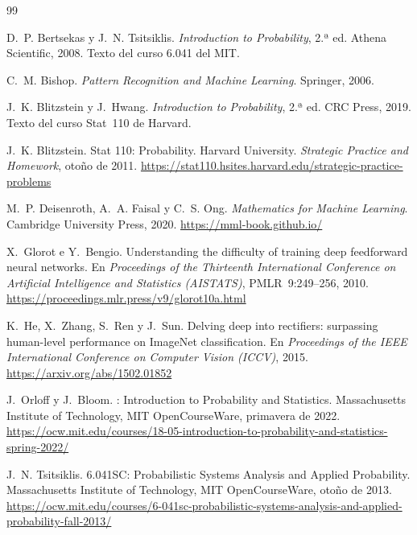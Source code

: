 \begin{thebibliography}{99}
\small

D.~P. Bertsekas y J.~N. Tsitsiklis.
\newblock \emph{Introduction to Probability}, 2.ª ed.
\newblock Athena Scientific, 2008.
\newblock Texto del curso 6.041 del MIT.

C.~M. Bishop.
\newblock \emph{Pattern Recognition and Machine Learning}.
\newblock Springer, 2006.

J.~K. Blitzstein y J.~Hwang.
\newblock \emph{Introduction to Probability}, 2.ª ed.
\newblock CRC Press, 2019.
\newblock Texto del curso Stat~110 de Harvard.

J.~K. Blitzstein.
\newblock Stat 110: Probability.
\newblock Harvard University. \emph{Strategic Practice and Homework}, otoño de 2011.
\newblock \url{https://stat110.hsites.harvard.edu/strategic-practice-problems}

M.~P. Deisenroth, A.~A. Faisal y C.~S. Ong.
\newblock \emph{Mathematics for Machine Learning}.
\newblock Cambridge University Press, 2020.
\newblock \url{https://mml-book.github.io/}

X.~Glorot e Y.~Bengio.
\newblock Understanding the difficulty of training deep feedforward neural networks.
\newblock En \emph{Proceedings of the Thirteenth International Conference on Artificial Intelligence and Statistics (AISTATS)}, PMLR~9:249--256, 2010.
\newblock \url{https://proceedings.mlr.press/v9/glorot10a.html}

K.~He, X.~Zhang, S.~Ren y J.~Sun.
\newblock Delving deep into rectifiers: surpassing human-level performance on ImageNet classification.
\newblock En \emph{Proceedings of the IEEE International Conference on Computer Vision (ICCV)}, 2015.
\newblock \url{https://arxiv.org/abs/1502.01852}

J.~Orloff y J.~Bloom.
: Introduction to Probability and Statistics.
\newblock Massachusetts Institute of Technology, MIT OpenCourseWare, primavera de 2022.
\newblock \url{https://ocw.mit.edu/courses/18-05-introduction-to-probability-and-statistics-spring-2022/}

J.~N. Tsitsiklis.
\newblock 6.041SC: Probabilistic Systems Analysis and Applied Probability.
\newblock Massachusetts Institute of Technology, MIT OpenCourseWare, otoño de 2013.
\newblock \url{https://ocw.mit.edu/courses/6-041sc-probabilistic-systems-analysis-and-applied-probability-fall-2013/}


\end{thebibliography}

